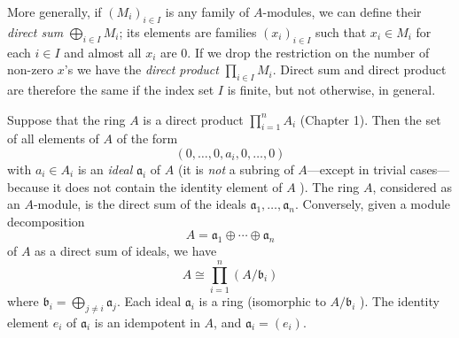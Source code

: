 \documentclass{standalone}
\theoremstyle{definition}
\theoremstyle{remark}
\begin{document}
More generally, if $(M_{i})_{i \in I}$ is any family of $A$-modules,
we can define their {\itshape direct sum} $\bigoplus_{i \in I} M_{i}$; its elements are
families $(x_{i})_{i \in I}$ such that $x_{i} \in M_{i}$ for each
$i \in I$ and almost all $x_{i}$ are 0. If we drop the restriction on the
number of non-zero $x$'s we have the {\itshape direct product} $\prod_{i \in I} M_{i}$.
Direct sum and direct product are therefore the same if the index set $I$ is
finite, but not otherwise, in general.

Suppose that the ring $A$ is a direct product $\prod_{i=1}^{n} A_{i}$ (Chapter
1). Then the set of all elements of $A$ of the form
\[
  (0, \ldots, 0, a_{i}, 0, \ldots, 0)
\]
with $a_{i} \in A_{i}$ is an {\itshape ideal} $\mathfrak{a}_{i}$ of $A$ (it is \textit{not} a subring of
$A$---except in trivial cases---because it does not contain the identity element of
$A$ ). The ring $A$, considered as an $A$-module, is the direct sum of the
ideals $\mathfrak{a}_{1}, \ldots, \mathfrak{a}_{n}$. Conversely, given a module
decomposition
\[
  A=\mathfrak{a}_{1} \oplus \cdots \oplus \mathfrak{a}_{n}
\]
of $A$ as a direct sum of ideals, we have
\[
  A \cong \prod_{i=1}^{n}(A / \mathfrak{b}_{i})
\]
where $\mathfrak{b}_{i}=\bigoplus_{j \neq i} \mathfrak{a}_{j}$. Each ideal
$\mathfrak{a}_{i}$ is a ring (isomorphic to $A / \mathfrak{b}_{i}$ ). The
identity element $e_{i}$ of $\mathfrak{a}_{i}$ is an
idempotent in $A$, and
$\mathfrak{a}_{i}=(e_{i})$.
\end{document}
